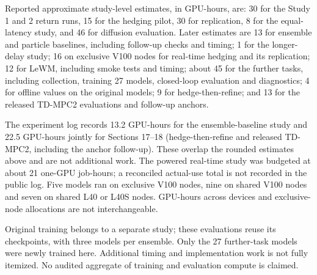 Reported approximate study-level estimates, in GPU-hours, are: 30 for the Study 1 and 2 return runs, 15 for the hedging pilot, 30 for replication, 8 for the equal-latency study, and 46 for diffusion evaluation. Later estimates are 13 for ensemble and particle baselines, including follow-up checks and timing; 1 for the longer-delay study; 16 on exclusive V100 nodes for real-time hedging and its replication; 12 for LeWM, including smoke tests and timing; about 45 for the further tasks, including collection, training 27 models, closed-loop evaluation and diagnostics; 4 for offline values on the original models; 9 for hedge-then-refine; and 13 for the released TD-MPC2 evaluations and follow-up anchors.

The experiment log records 13.2 GPU-hours for the ensemble-baseline study and 22.5 GPU-hours jointly for Sections 17--18 (hedge-then-refine and released TD-MPC2, including the anchor follow-up). These overlap the rounded estimates above and are not additional work. The powered real-time study was budgeted at about 21 one-GPU job-hours; a reconciled actual-use total is not recorded in the public log. Five models ran on exclusive V100 nodes, nine on shared V100 nodes and seven on shared L40 or L40S nodes. GPU-hours across devices and exclusive-node allocations are not interchangeable.

Original training belongs to a separate study; these evaluations reuse its checkpoints, with three models per ensemble. Only the 27 further-task models were newly trained here. Additional timing and implementation work is not fully itemized. No audited aggregate of training and evaluation compute is claimed.
